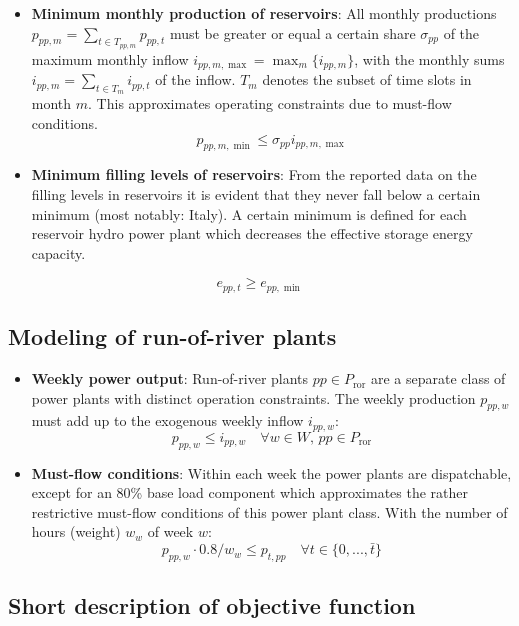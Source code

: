 \documentclass[]{article}
\begin{document}
\begin{itemize}
\item
  \textbf{Minimum monthly production of reservoirs}: All monthly
  productions $p_{pp,m} = \sum_{t \in T_{pp,m}} p_{pp,t}$ must be
  greater or equal a certain share $\sigma_{pp}$ of the maximum monthly
  inflow $i_{pp,m,\max} = \max_m \{i_{pp,m}\}$, with the monthly sums
  $i_{pp,m} = \sum_{t \in T_{m}} i_{pp,t}$ of the inflow. $T_{m}$
  denotes the subset of time slots in month $m$. This approximates
  operating constraints due to must-flow conditions.
  \[ p_{pp,m,\min} \leqslant \sigma_{pp}  i_{pp,m,\max}\]
\item
  \textbf{Minimum filling levels of reservoirs}: From the reported data
  on the filling levels in reservoirs it is evident that they never fall
  below a certain minimum (most notably: Italy). A certain minimum is
  defined for each reservoir hydro power plant which decreases the
  effective storage energy capacity.
\end{itemize}

\[e_{pp,t} \geqslant e_{pp,\min}\]

\subsection{Modeling of run-of-river
plants}\label{modeling-of-run-of-river-plants}

\begin{itemize}
\itemsep1pt\parskip0pt
\item
  \textbf{Weekly power output}: Run-of-river plants
  $pp\in P_\mathrm{ror}$ are a separate class of power plants with
  distinct operation constraints. The weekly production $p_{pp,w}$ must
  add up to the exogenous weekly inflow $i_{pp,w}$: \[
  p_{pp,w} \leqslant i_{pp,w}\quad \forall w\in W,\,pp\in P_\mathrm{ror}
  \]
\item
  \textbf{Must-flow conditions}: Within each week the power plants are
  dispatchable, except for an 80\% base load component which
  approximates the rather restrictive must-flow conditions of this power
  plant class. With the number of hours (weight) $w_w$ of week $w$:
  \[p_{pp,w}\cdot 0.8/w_w \leqslant p_{t,pp}\quad \forall t\in \{0,...,\bar t\}\]
\end{itemize}

\subsection{Short description of objective
function}\label{short-description-of-objective-function}
\end{document}
